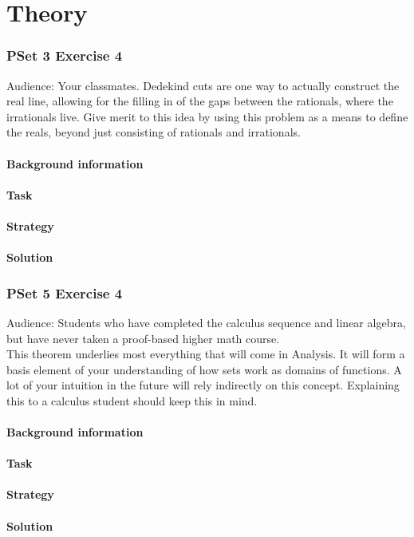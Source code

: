 \documentclass[11 pt]{article}
\begin{document}
\part{Theory}
\section{PSet 3 Exercise 4}
Audience: Your classmates.
Dedekind cuts are one way to actually construct the real line, allowing for the filling in of the gaps between the rationals, where the irrationals live. Give merit to this idea by using this problem as a means to define the reals, beyond just consisting of rationals and irrationals.
\begin{multicols*}{2}
\subsection{Background information}
\subsection{Task}
\subsection{Strategy}
\columnbreak
\subsection{Solution}
\end{multicols*}
\pagebreak

\section{PSet 5 Exercise 4}
Audience: Students who have completed the calculus sequence and linear algebra, but have never taken a proof-based higher math course.\\
This theorem underlies most everything that will come in Analysis. It will form a basis element of your understanding of how sets work as domains of functions. A lot of your intuition in the future will rely indirectly on this concept. Explaining this to a calculus student should keep this in mind.
\begin{multicols*}{2} 
\subsection{Background information}
\subsection{Task}
\subsection{Strategy}
\columnbreak
\subsection{Solution}
\end{multicols*}
\pagebreak
\end{document}
